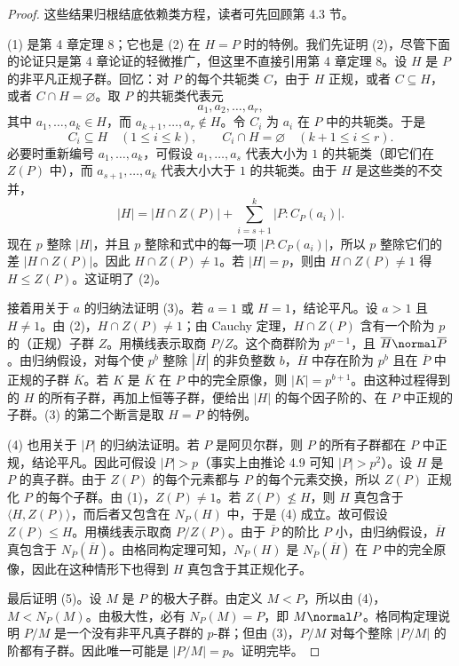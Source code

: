 \begin{proof}
这些结果归根结底依赖类方程，读者可先回顾第 4.3 节。

(1) 是第 4 章定理 8；它也是 (2) 在 $H=P$ 时的特例。我们先证明 (2)，尽管下面的论证只是第 4 章论证的轻微推广，但这里不直接引用第 4 章定理 8。设 $H$ 是 $P$ 的非平凡正规子群。回忆：对 $P$ 的每个共轭类 $C$，由于 $H$ 正规，或者 $C\subseteq H$，或者 $C\cap H=\varnothing$。取 $P$ 的共轭类代表元
\[
  a_1,a_2,\ldots,a_r,
\]
其中 $a_1,\ldots,a_k\in H$，而 $a_{k+1},\ldots,a_r\notin H$。令 $C_i$ 为 $a_i$ 在 $P$ 中的共轭类。于是
\[
  C_i\subseteq H\quad (1\leq i\leq k),
  \qquad
  C_i\cap H=\varnothing\quad (k+1\leq i\leq r).
\]
必要时重新编号 $a_1,\ldots,a_k$，可假设 $a_1,\ldots,a_s$ 代表大小为 $1$ 的共轭类（即它们在 $Z(P)$ 中），而 $a_{s+1},\ldots,a_k$ 代表大小大于 $1$ 的共轭类。由于 $H$ 是这些类的不交并，
\[
  |H|=|H\cap Z(P)|+\sum_{i=s+1}^{k}|P:C_P(a_i)|.
\]
现在 $p$ 整除 $|H|$，并且 $p$ 整除和式中的每一项 $|P:C_P(a_i)|$，所以 $p$ 整除它们的差 $|H\cap Z(P)|$。因此 $H\cap Z(P)\neq 1$。若 $|H|=p$，则由 $H\cap Z(P)\neq 1$ 得 $H\leq Z(P)$。这证明了 (2)。

接着用关于 $a$ 的归纳法证明 (3)。若 $a=1$ 或 $H=1$，结论平凡。设 $a>1$ 且 $H\neq 1$。由 (2)，$H\cap Z(P)\neq 1$；由 Cauchy 定理，$H\cap Z(P)$ 含有一个阶为 $p$ 的（正规）子群 $Z$。用横线表示取商 $P/Z$。这个商群阶为 $p^{a-1}$，且 $\overline H\normal \overline P$。由归纳假设，对每个使 $p^b$ 整除 $|\overline H|$ 的非负整数 $b$，$\overline H$ 中存在阶为 $p^b$ 且在 $\overline P$ 中正规的子群 $\overline K$。若 $K$ 是 $\overline K$ 在 $P$ 中的完全原像，则 $|K|=p^{b+1}$。由这种过程得到的 $H$ 的所有子群，再加上恒等子群，便给出 $|H|$ 的每个因子阶的、在 $P$ 中正规的子群。(3) 的第二个断言是取 $H=P$ 的特例。

(4) 也用关于 $|P|$ 的归纳法证明。若 $P$ 是阿贝尔群，则 $P$ 的所有子群都在 $P$ 中正规，结论平凡。因此可假设 $|P|>p$（事实上由推论 4.9 可知 $|P|>p^2$）。设 $H$ 是 $P$ 的真子群。由于 $Z(P)$ 的每个元素都与 $P$ 的每个元素交换，所以 $Z(P)$ 正规化 $P$ 的每个子群。由 (1)，$Z(P)\neq 1$。若 $Z(P)\nleq H$，则 $H$ 真包含于 $\langle H,Z(P)\rangle$，而后者又包含在 $N_P(H)$ 中，于是 (4) 成立。故可假设 $Z(P)\leq H$。用横线表示取商 $P/Z(P)$。由于 $\overline P$ 的阶比 $P$ 小，由归纳假设，$\overline H$ 真包含于 $N_{\overline P}(\overline H)$。由格同构定理可知，$N_P(H)$ 是 $N_{\overline P}(\overline H)$ 在 $P$ 中的完全原像，因此在这种情形下也得到 $H$ 真包含于其正规化子。

最后证明 (5)。设 $M$ 是 $P$ 的极大子群。由定义 $M<P$，所以由 (4)，$M<N_P(M)$。由极大性，必有 $N_P(M)=P$，即 $M\normal P$。格同构定理说明 $P/M$ 是一个没有非平凡真子群的 $p$-群；但由 (3)，$P/M$ 对每个整除 $|P/M|$ 的阶都有子群。因此唯一可能是 $|P/M|=p$。证明完毕。
\end{proof}

